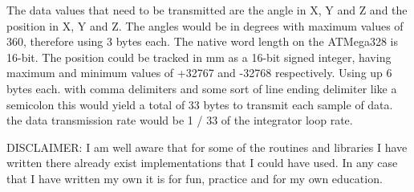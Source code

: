\documentclass[10pt, a4paper]{article}
\begin{document}
The data values that need to be transmitted are the angle in X, Y and Z and the position in X, Y and Z. The angles would be in degrees with maximum values of 360, therefore using 3 bytes each. The native word length on the ATMega328 is 16-bit. The position could be tracked in mm as a 16-bit signed integer, having maximum and minimum values of +32767 and -32768 respectively. Using up 6 bytes each.
with comma delimiters and some sort of line ending delimiter like a semicolon this would yield a total of 33 bytes to transmit each sample of data. the data transmission rate would be 1 / 33 of the integrator loop rate.

DISCLAIMER: I am well aware that for some of the routines and libraries I have written there already exist implementations that I could have used. In any case that I have written my own it is for fun, practice and for my own education. 
\end{document}
